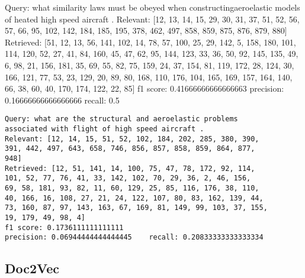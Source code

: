 \documentclass[12pt]{llncs}
\begin{document}
Query: what similarity laws must be obeyed when
constructingaeroelastic models of heated high speed
aircraft .
Relevant: [12, 13, 14, 15, 29, 30, 31, 37, 51, 52, 56,
57, 66, 95, 102, 142, 184, 185, 195, 378, 462, 497, 858,
859, 875, 876, 879, 880]
Retrieved: [51, 12, 13, 56, 141, 102, 14, 78, 57, 100,
25, 29, 142, 5, 158, 180, 101, 114, 120, 52, 27, 41, 84,
160, 45, 47, 62, 95, 144, 123, 33, 36, 50, 92, 145, 135,
49, 6, 98, 21, 156, 181, 35, 69, 55, 82, 75, 159, 24, 37,
154, 81, 119, 172, 28, 124, 30, 166, 121, 77, 53, 23,
129, 20, 89, 80, 168, 110, 176, 104, 165, 169, 157, 164,
140, 66, 38, 60, 40, 170, 174, 122, 22, 85]
f1 score: 0.41666666666666663
precision: 0.16666666666666666    recall: 0.5
\begin{verbatim}
Query: what are the structural and aeroelastic problems
associated with flight of high speed aircraft .
Relevant: [12, 14, 15, 51, 52, 102, 184, 202, 285, 380, 390,
391, 442, 497, 643, 658, 746, 856, 857, 858, 859, 864, 877,
948]
Retrieved: [12, 51, 141, 14, 100, 75, 47, 78, 172, 92, 114,
101, 52, 77, 76, 41, 33, 142, 102, 70, 29, 36, 2, 46, 156,
69, 58, 181, 93, 82, 11, 60, 129, 25, 85, 116, 176, 38, 110,
40, 166, 16, 108, 27, 21, 24, 122, 107, 80, 83, 162, 139, 44,
73, 160, 87, 97, 143, 163, 67, 169, 81, 149, 99, 103, 37, 155,
19, 179, 49, 98, 4]
f1 score: 0.1736111111111111
precision: 0.06944444444444445    recall: 0.20833333333333334
\end{verbatim}

\subsection*{Doc2Vec}
\end{document}
